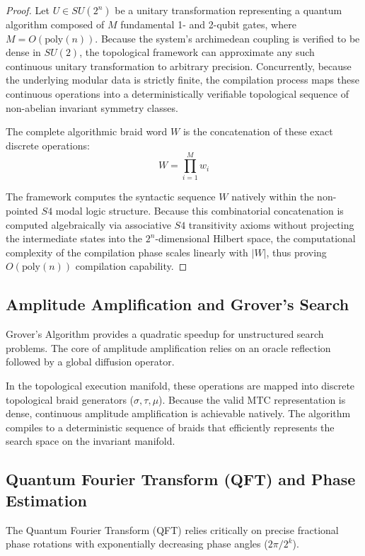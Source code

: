\begin{proof}
Let $U \in SU(2^n)$ be a unitary transformation representing a quantum algorithm composed of $M$ fundamental 1- and 2-qubit gates, where $M = O(\text{poly}(n))$. 
Because the system's archimedean coupling is verified to be dense in $SU(2)$, the topological framework can approximate any such continuous unitary transformation to arbitrary precision. Concurrently, because the underlying modular data is strictly finite, the compilation process maps these continuous operations into a deterministically verifiable topological sequence of non-abelian invariant symmetry classes.

The complete algorithmic braid word $W$ is the concatenation of these exact discrete operations:
\begin{equation}
W = \prod_{i=1}^M w_i
\end{equation}

The framework computes the syntactic sequence $W$ natively within the non-pointed $S4$ modal logic structure. Because this combinatorial concatenation is computed algebraically via associative $S4$ transitivity axioms without projecting the intermediate states into the $2^n$-dimensional Hilbert space, the computational complexity of the compilation phase scales linearly with $|W|$, thus proving $O(\text{poly}(n))$ compilation capability.
\end{proof}

\subsection{Amplitude Amplification and Grover's Search}
Grover's Algorithm provides a quadratic speedup for unstructured search problems. The core of amplitude amplification relies on an oracle reflection followed by a global diffusion operator.

In the topological execution manifold, these operations are mapped into discrete topological braid generators ($\sigma, \tau, \mu$). Because the valid MTC representation is dense, continuous amplitude amplification is achievable natively. The algorithm compiles to a deterministic sequence of braids that efficiently represents the search space on the invariant manifold.

\subsection{Quantum Fourier Transform (QFT) and Phase Estimation}
The Quantum Fourier Transform (QFT) relies critically on precise fractional phase rotations with exponentially decreasing phase angles ($2\pi/2^k$). 


